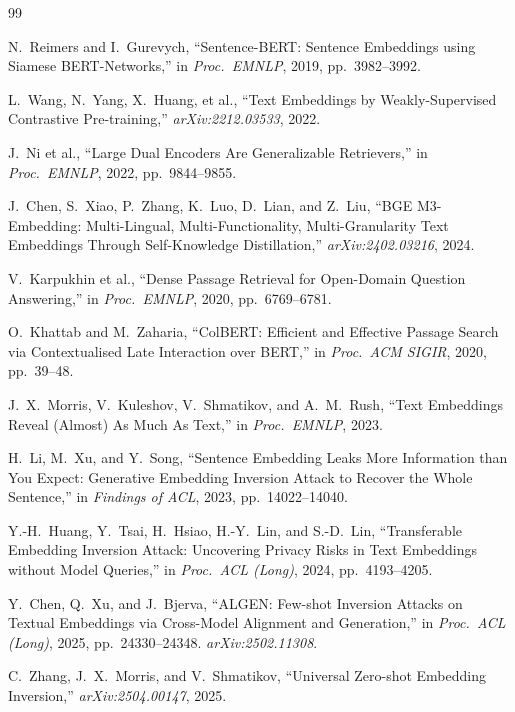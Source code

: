 \documentclass[11pt,a4paper]{article}
\begin{document}
\begin{thebibliography}{99}\small

 N.\ Reimers and I.\ Gurevych, ``Sentence-BERT:
Sentence Embeddings using Siamese BERT-Networks,'' in
\emph{Proc.\ EMNLP}, 2019, pp.\ 3982--3992.

 L.\ Wang, N.\ Yang, X.\ Huang, et al.,
``Text Embeddings by Weakly-Supervised Contrastive Pre-training,''
\emph{arXiv:2212.03533}, 2022.

 J.\ Ni et al., ``Large Dual Encoders Are Generalizable
Retrievers,'' in \emph{Proc.\ EMNLP}, 2022, pp.\ 9844--9855.

 J.\ Chen, S.\ Xiao, P.\ Zhang, K.\ Luo, D.\ Lian,
and Z.\ Liu, ``BGE M3-Embedding: Multi-Lingual, Multi-Functionality,
Multi-Granularity Text Embeddings Through Self-Knowledge Distillation,''
\emph{arXiv:2402.03216}, 2024.

 V.\ Karpukhin et al., ``Dense Passage Retrieval for
Open-Domain Question Answering,'' in \emph{Proc.\ EMNLP}, 2020,
pp.\ 6769--6781.

 O.\ Khattab and M.\ Zaharia, ``ColBERT: Efficient
and Effective Passage Search via Contextualised Late Interaction over
BERT,'' in \emph{Proc.\ ACM SIGIR}, 2020, pp.\ 39--48.

 J.\ X.\ Morris, V.\ Kuleshov, V.\ Shmatikov, and
A.\ M.\ Rush, ``Text Embeddings Reveal (Almost) As Much As Text,'' in
\emph{Proc.\ EMNLP}, 2023.

 H.\ Li, M.\ Xu, and Y.\ Song, ``Sentence Embedding
Leaks More Information than You Expect: Generative Embedding Inversion
Attack to Recover the Whole Sentence,'' in \emph{Findings of ACL}, 2023,
pp.\ 14022--14040.

 Y.-H.\ Huang, Y.\ Tsai, H.\ Hsiao, H.-Y.\ Lin, and
S.-D.\ Lin, ``Transferable Embedding Inversion Attack: Uncovering Privacy
Risks in Text Embeddings without Model Queries,'' in \emph{Proc.\ ACL
(Long)}, 2024, pp.\ 4193--4205.

 Y.\ Chen, Q.\ Xu, and J.\ Bjerva, ``ALGEN: Few-shot
Inversion Attacks on Textual Embeddings via Cross-Model Alignment and
Generation,'' in \emph{Proc.\ ACL (Long)}, 2025, pp.\ 24330--24348.
\emph{arXiv:2502.11308}.

 C.\ Zhang, J.\ X.\ Morris, and V.\ Shmatikov,
``Universal Zero-shot Embedding Inversion,'' \emph{arXiv:2504.00147}, 2025.


\end{thebibliography}
\end{document}
